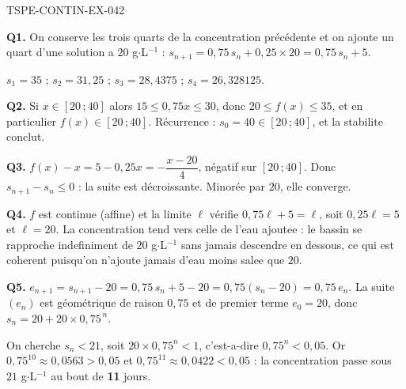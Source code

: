 \begin{corrige}{TSPE-CONTIN-EX-042}

\textbf{Q1.} On conserve les trois quarts de la concentration précédente et on ajoute un quart d'une solution a $20$ g$\cdot$L$^{-1}$ : $s_{n+1} = 0{,}75\,s_n + 0{,}25 \times 20 = 0{,}75\,s_n + 5$.

$s_1 = 35$ ; $s_2 = 31{,}25$ ; $s_3 = 28{,}4375$ ; $s_4 = 26{,}328125$.

\textbf{Q2.} Si $x \in [20\,;40]$ alors $15 \leq 0{,}75x \leq 30$, donc $20 \leq f(x) \leq 35$, et en particulier $f(x) \in [20\,;40]$. Récurrence : $s_0 = 40 \in [20\,;40]$, et la stabilite conclut.

\textbf{Q3.} $f(x) - x = 5 - 0{,}25x = -\dfrac{x-20}{4}$, négatif sur $[20\,;40]$. Donc $s_{n+1} - s_n \leq 0$ : la suite est décroissante. Minorée par $20$, elle converge.

\textbf{Q4.} $f$ est continue (affine) et la limite $\ell$ vérifie $0{,}75\ell + 5 = \ell$, soit $0{,}25\ell = 5$ et $\ell = 20$. La concentration tend vers celle de l'eau ajoutee : le bassin se rapproche indefiniment de $20$ g$\cdot$L$^{-1}$ sans jamais descendre en dessous, ce qui est coherent puisqu'on n'ajoute jamais d'eau moins salee que $20$.

\textbf{Q5.} $e_{n+1} = s_{n+1} - 20 = 0{,}75\,s_n + 5 - 20 = 0{,}75(s_n - 20) = 0{,}75\,e_n$. La suite $(e_n)$ est géométrique de raison $0{,}75$ et de premier terme $e_0 = 20$, donc $s_n = 20 + 20 \times 0{,}75^{\,n}$.

On cherche $s_n < 21$, soit $20 \times 0{,}75^n < 1$, c'est-a-dire $0{,}75^n < 0{,}05$. Or $0{,}75^{10} \approx 0{,}0563 > 0{,}05$ et $0{,}75^{11} \approx 0{,}0422 < 0{,}05$ : la concentration passe sous $21$ g$\cdot$L$^{-1}$ au bout de \textbf{11} jours.
\end{corrige}
